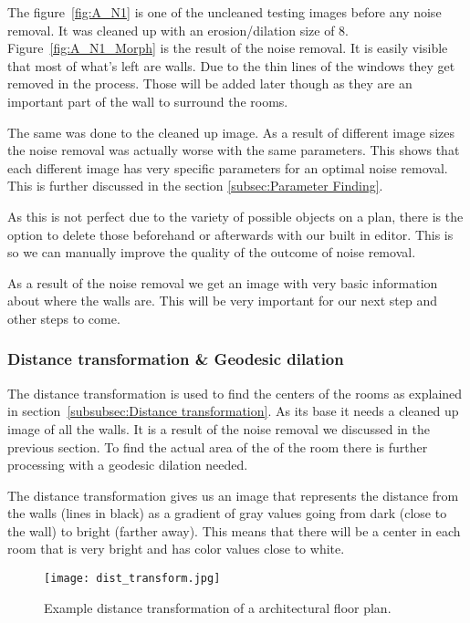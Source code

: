 The figure~\ref{fig:A_N1} is one of the uncleaned testing images before any noise removal. It was cleaned up with an erosion/dilation size of 8. Figure~\ref{fig:A_N1_Morph} is the result of the noise removal. It is easily visible that most of what's left are walls. Due to the thin lines of the windows they get removed in the process. Those will be added later though as they are an important part of the wall to surround the rooms.

The same was done to the cleaned up image. As a result of different image sizes the noise removal was actually worse with the same parameters. This shows that each different image has very specific parameters for an optimal noise removal. This is further discussed in the section \ref{subsec:Parameter Finding}.

As this is not perfect due to the variety of possible objects on a plan, there is the option to delete those beforehand or afterwards with our built in editor. This is so we can manually improve the quality of the outcome of noise removal.

As a result of the noise removal we get an image with very basic information about where the walls are. This will be very important for our next step and other steps to come.

\subsubsection{Distance transformation \& Geodesic dilation}
The distance transformation is used to find the centers of the rooms as explained in section~\ref{subsubsec:Distance transformation}. As its base it needs a cleaned up image of all the walls. It is a result of the noise removal we discussed in the previous section. To find the actual area of the of the room there is further processing with a geodesic dilation needed.

The distance transformation gives us an image that represents the distance from the walls (lines in black) as a gradient of gray values going from dark (close to the wall) to bright (farther away). This means that there will be a center in each room that is very bright and has color values close to white.

\begin{figure}[H]
	\centering
	\texttt{[image: dist\_transform.jpg]}
	\caption{Example distance transformation of a architectural floor plan.}
	\label{fig:dist_transform}
\end{figure}

